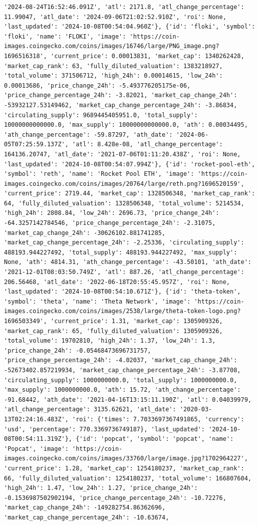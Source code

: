 \documentclass[
  letterpaper,
  DIV=11,
  numbers=noendperiod]{scrreprt}
\begin{document}
\begin{verbatim}
'2024-08-24T16:52:46.091Z', 'atl': 2171.8, 'atl_change_percentage': 11.99047, 'atl_date': '2024-09-06T21:02:52.910Z', 'roi': None, 'last_updated': '2024-10-08T00:54:04.960Z'}, {'id': 'floki', 'symbol': 'floki', 'name': 'FLOKI', 'image': 'https://coin-images.coingecko.com/coins/images/16746/large/PNG_image.png?1696516318', 'current_price': 0.00013831, 'market_cap': 1340262428, 'market_cap_rank': 63, 'fully_diluted_valuation': 1383218927, 'total_volume': 371506712, 'high_24h': 0.00014615, 'low_24h': 0.00013686, 'price_change_24h': -5.493776205175e-06, 'price_change_percentage_24h': -3.82021, 'market_cap_change_24h': -53932127.53149462, 'market_cap_change_percentage_24h': -3.86834, 'circulating_supply': 9689445405951.0, 'total_supply': 10000000000000.0, 'max_supply': 10000000000000.0, 'ath': 0.00034495, 'ath_change_percentage': -59.87297, 'ath_date': '2024-06-05T07:25:59.137Z', 'atl': 8.428e-08, 'atl_change_percentage': 164136.20747, 'atl_date': '2021-07-06T01:11:20.438Z', 'roi': None, 'last_updated': '2024-10-08T00:54:07.994Z'}, {'id': 'rocket-pool-eth', 'symbol': 'reth', 'name': 'Rocket Pool ETH', 'image': 'https://coin-images.coingecko.com/coins/images/20764/large/reth.png?1696520159', 'current_price': 2719.44, 'market_cap': 1328506348, 'market_cap_rank': 64, 'fully_diluted_valuation': 1328506348, 'total_volume': 5214534, 'high_24h': 2808.84, 'low_24h': 2696.73, 'price_change_24h': -64.3257142784546, 'price_change_percentage_24h': -2.31075, 'market_cap_change_24h': -30626102.881741285, 'market_cap_change_percentage_24h': -2.25336, 'circulating_supply': 488193.944227492, 'total_supply': 488193.944227492, 'max_supply': None, 'ath': 4814.31, 'ath_change_percentage': -43.50101, 'ath_date': '2021-12-01T08:03:50.749Z', 'atl': 887.26, 'atl_change_percentage': 206.56468, 'atl_date': '2022-06-18T20:55:45.957Z', 'roi': None, 'last_updated': '2024-10-08T00:54:10.671Z'}, {'id': 'theta-token', 'symbol': 'theta', 'name': 'Theta Network', 'image': 'https://coin-images.coingecko.com/coins/images/2538/large/theta-token-logo.png?1696503349', 'current_price': 1.31, 'market_cap': 1305909326, 'market_cap_rank': 65, 'fully_diluted_valuation': 1305909326, 'total_volume': 19702810, 'high_24h': 1.37, 'low_24h': 1.3, 'price_change_24h': -0.05468473696731757, 'price_change_percentage_24h': -4.02037, 'market_cap_change_24h': -52673402.857219934, 'market_cap_change_percentage_24h': -3.87708, 'circulating_supply': 1000000000.0, 'total_supply': 1000000000.0, 'max_supply': 1000000000.0, 'ath': 15.72, 'ath_change_percentage': -91.68442, 'ath_date': '2021-04-16T13:15:11.190Z', 'atl': 0.04039979, 'atl_change_percentage': 3135.62621, 'atl_date': '2020-03-13T02:24:16.483Z', 'roi': {'times': 7.7033697367491865, 'currency': 'usd', 'percentage': 770.3369736749187}, 'last_updated': '2024-10-08T00:54:11.319Z'}, {'id': 'popcat', 'symbol': 'popcat', 'name': 'Popcat', 'image': 'https://coin-images.coingecko.com/coins/images/33760/large/image.jpg?1702964227', 'current_price': 1.28, 'market_cap': 1254180237, 'market_cap_rank': 66, 'fully_diluted_valuation': 1254180237, 'total_volume': 166807604, 'high_24h': 1.47, 'low_24h': 1.27, 'price_change_24h': -0.1536987502902194, 'price_change_percentage_24h': -10.72276, 'market_cap_change_24h': -149282754.86362696, 'market_cap_change_percentage_24h': -10.63674, 
\end{verbatim}
\end{document}

